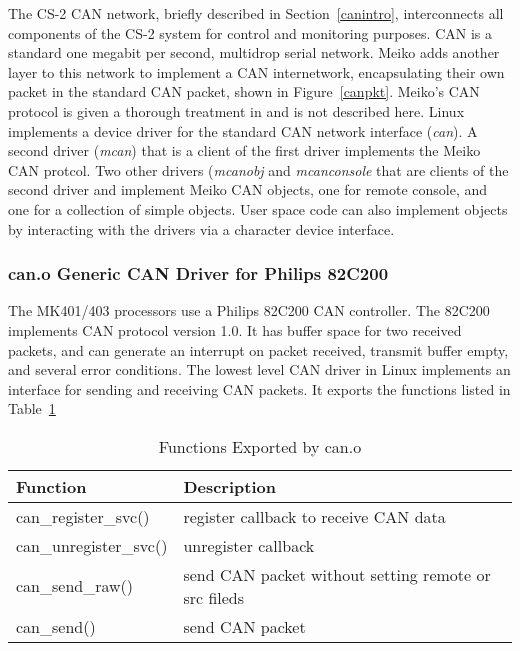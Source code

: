 \documentclass{article}
\begin{document}
The CS-2 CAN network, briefly described in Section~\ref{canintro}, 
interconnects all components of the CS-2 system for control and monitoring
purposes.  CAN is a standard one megabit per second, multidrop serial 
network.  Meiko adds another layer to this network to implement a CAN 
internetwork, encapsulating their own packet in the standard CAN packet,
shown in Figure~\ref{canpkt}.  Meiko's CAN protocol is given a thorough 
treatment in \cite{Meiko95c} and is not described here.
Linux implements a device driver for the standard CAN network interface
({\em can}).  A second driver ({\em mcan}) that is a client of the first 
driver implements the Meiko CAN protcol.  
Two other drivers ({\em mcanobj} and {\em mcanconsole} that are clients of 
the second driver and implement Meiko CAN objects, one for remote console, 
and one for a collection of simple objects.  User space code can also 
implement objects by interacting with the drivers via a character device 
interface.

\subsubsection{can.o Generic CAN Driver for Philips 82C200}

  The MK401/403 processors use a Philips 82C200 CAN controller\cite{Phil90}.
The 82C200 implements CAN protocol version 1.0.  It has buffer space for
two received packets, and can generate an interrupt on packet received,
transmit buffer empty, and several error conditions.  The lowest level CAN
driver in Linux implements an interface for sending and receiving CAN packets.
It exports the functions listed in Table~\ref{canfun}

\begin{table}
\begin{center}
\begin{tabular}{|l|l|}\hline\hline
Function			& Description \\ \hline
can\_register\_svc()		& register callback to receive CAN data \\
can\_unregister\_svc()		& unregister callback \\
can\_send\_raw()		& send CAN packet without setting remote or src fileds \\
can\_send()			& send CAN packet \\ \hline
\end{tabular}
\caption{Functions Exported by can.o}
\label{canfun}
\end{center}
\end{table}
\end{document}
